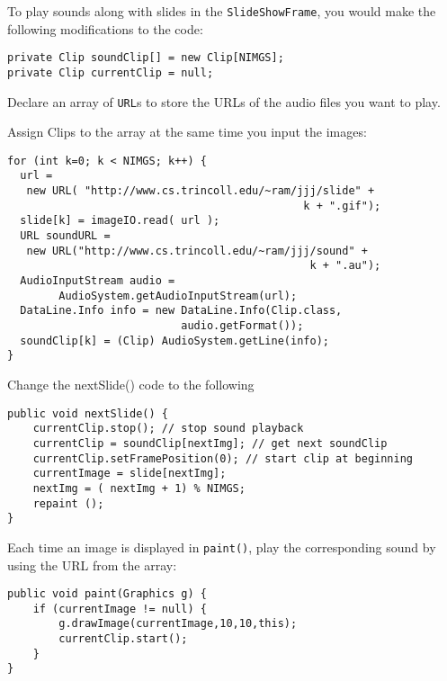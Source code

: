 \begin{ANS}
\item  To play sounds along with slides in the {\tt SlideShowFrame},
you would make the following modifications to the code:
\begin{jjjlisting}
\begin{lstlisting}
private Clip soundClip[] = new Clip[NIMGS];
private Clip currentClip = null;
\end{lstlisting}
\end{jjjlisting}

\noindent Declare an array of {\tt URL}s to store the URLs of
the audio files you want to play.

\hspace*{1pc}Assign Clips to the array at the same time
you input the images:

\begin{jjjlisting}
\begin{lstlisting}
for (int k=0; k < NIMGS; k++) {
  url = 
   new URL( "http://www.cs.trincoll.edu/~ram/jjj/slide" + 
                                              k + ".gif");
  slide[k] = imageIO.read( url );
  URL soundURL = 
   new URL("http://www.cs.trincoll.edu/~ram/jjj/sound" +
                                               k + ".au");
  AudioInputStream audio =
		AudioSystem.getAudioInputStream(url); 
  DataLine.Info info = new DataLine.Info(Clip.class, 
						   audio.getFormat()); 
  soundClip[k] = (Clip) AudioSystem.getLine(info);
}
\end{lstlisting}
\end{jjjlisting}

\noindent Change the nextSlide() code to the following

\begin{jjjlisting}
\begin{lstlisting}
public void nextSlide() {
    currentClip.stop(); // stop sound playback
    currentClip = soundClip[nextImg]; // get next soundClip
    currentClip.setFramePosition(0); // start clip at beginning
    currentImage = slide[nextImg]; 
    nextImg = ( nextImg + 1) % NIMGS; 
    repaint ();
}
\end{lstlisting}
\end{jjjlisting}

\noindent Each time an image is displayed in {\tt paint()}, play
the corresponding sound by using the URL from the array:

\begin{jjjlisting}
\begin{lstlisting}
public void paint(Graphics g) {
    if (currentImage != null) {
        g.drawImage(currentImage,10,10,this);
        currentClip.start();
    }
}
\end{lstlisting}
\end{jjjlisting}


\end{ANS}
